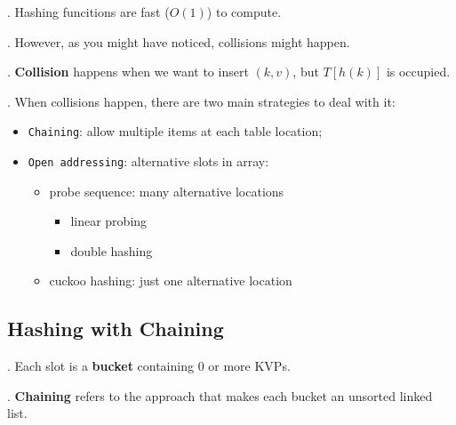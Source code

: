 \documentclass{article}
\begin{document}
\begin{result}[].
    Hashing funcitions are fast ($O(1)$) to compute. 
\end{result}

\begin{discovery}[].
    However, as you might have noticed, collisions might happen. 
\end{discovery}

\begin{deff}.
    \textbf{Collision} happens when we want to insert $(k, v)$, but $T[h(k)]$ is occupied. 
\end{deff}

\begin{algo}[].
    When collisions happen, there are two main strategies to deal with it: 
    \begin{itemize}
        \item \texttt{Chaining}: allow multiple items at each table location; 
        \item \texttt{Open addressing}: alternative slots in array: 
        \begin{itemize}
            \item probe sequence: many alternative locations \begin{itemize}
                \item linear probing 
                \item double hashing
            \end{itemize} 
            \item cuckoo hashing: just one alternative location
        \end{itemize}
    \end{itemize}
\end{algo}

\subsection{Hashing with Chaining} 

\begin{deff}.
    Each slot is a \textbf{bucket} containing 0 or more KVPs. 
\end{deff}

\begin{deff}.
    \textbf{Chaining} refers to the approach that makes each bucket an unsorted linked list. 
\end{deff}
\end{document}
